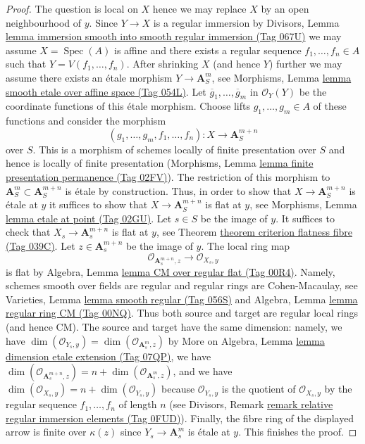 \documentclass{amsart}
\theoremstyle{plain}
\theoremstyle{definition}
\theoremstyle{remark}
\numberwithin{equation}{subsection}
\def\Spec{\mathop{\mathrm{Spec}}}
\begin{document}
\begin{proof}
The question is local on $X$ hence we may replace $X$ by
an open neighbourhood of $y$. Since $Y \to X$ is a regular immersion
by Divisors, Lemma
\href{https://stacks.math.columbia.edu/tag/067U}{lemma immersion smooth into smooth regular immersion (Tag 067U)}
we may assume $X = \Spec(A)$ is affine and there exists a regular sequence
$f_1, \ldots, f_n \in A$ such that $Y = V(f_1, \ldots, f_n)$.
After shrinking $X$ (and hence $Y$) further
we may assume there exists an \'etale morphism $Y \to \mathbf{A}^m_S$, see
Morphisms, Lemma \href{https://stacks.math.columbia.edu/tag/054L}{lemma smooth etale over affine space (Tag 054L)}.
Let $\overline{g}_1, \ldots, \overline{g}_m$ in $\mathcal{O}_Y(Y)$
be the coordinate functions of this \'etale morphism.
Choose lifts $g_1, \ldots, g_m \in A$ of these functions
and consider the morphism
$$
(g_1, \ldots, g_m, f_1, \ldots, f_n) :
X
\longrightarrow
\mathbf{A}^{m + n}_S
$$
over $S$. This is a morphism of schemes locally of finite presentation
over $S$ and hence is locally of finite presentation
(Morphisms, Lemma \href{https://stacks.math.columbia.edu/tag/02FV}{lemma finite presentation permanence (Tag 02FV)}).
The restriction of this morphism to
$\mathbf{A}^m_S \subset \mathbf{A}^{m + n}_S$
is \'etale by construction. Thus, in order to show that
$X \to \mathbf{A}^{m + n}_S$ is \'etale at $y$
it suffices to show that $X \to \mathbf{A}^{m + n}_S$ is flat at $y$,
see Morphisms, Lemma \href{https://stacks.math.columbia.edu/tag/02GU}{lemma etale at point (Tag 02GU)}.
Let $s \in S$ be the image of $y$. It suffices to check that
$X_s \to \mathbf{A}^{m + n}_s$ is flat at $y$, see
Theorem \href{https://stacks.math.columbia.edu/tag/039C}{theorem criterion flatness fibre (Tag 039C)}.
Let $z \in \mathbf{A}^{m + n}_s$ be the image of $y$.
The local ring map
$$
\mathcal{O}_{\mathbf{A}^{m + n}_s, z}
\longrightarrow
\mathcal{O}_{X_s, y}
$$
is flat by Algebra, Lemma \href{https://stacks.math.columbia.edu/tag/00R4}{lemma CM over regular flat (Tag 00R4)}.
Namely, schemes smooth over fields are regular and regular rings
are Cohen-Macaulay, see Varieties, Lemma \href{https://stacks.math.columbia.edu/tag/056S}{lemma smooth regular (Tag 056S)}
and Algebra, Lemma \href{https://stacks.math.columbia.edu/tag/00NQ}{lemma regular ring CM (Tag 00NQ)}.
Thus both source and target are regular local rings (and hence CM).
The source and target have the same dimension: namely, we have
$\dim(\mathcal{O}_{Y_s, y}) = \dim(\mathcal{O}_{\mathbf{A}^m_s, z})$
by More on Algebra, Lemma \href{https://stacks.math.columbia.edu/tag/07QP}{lemma dimension etale extension (Tag 07QP)},
we have $\dim(\mathcal{O}_{\mathbf{A}^{m + n}_s, z}) = n +
\dim(\mathcal{O}_{\mathbf{A}^m_s, z})$, and we have
$\dim(\mathcal{O}_{X_s, y}) = n + \dim(\mathcal{O}_{Y_s, y})$
because $\mathcal{O}_{Y_s, y}$ is the quotient of
$\mathcal{O}_{X_s, y}$ by the regular sequence $f_1, \ldots, f_n$
of length $n$ (see
Divisors, Remark \href{https://stacks.math.columbia.edu/tag/0FUD}{remark relative regular immersion elements (Tag 0FUD)}).
Finally, the fibre ring of the displayed arrow is finite over $\kappa(z)$
since $Y_s \to \mathbf{A}^m_s$ is \'etale at $y$.
This finishes the proof.
\end{proof}
\end{document}
